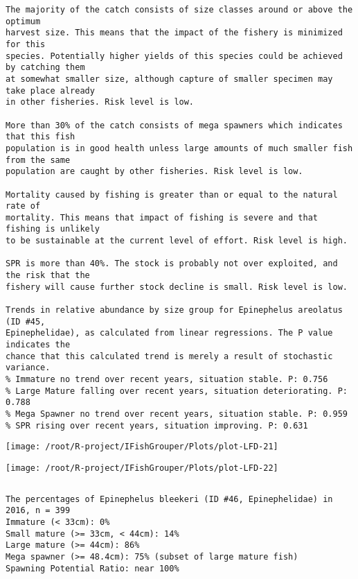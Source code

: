\documentclass{report}\usepackage[]{graphicx}\usepackage[]{color}
\makeatletter
\def\maxwidth{ %
  \ifdim\Gin@nat@width>\linewidth
    \linewidth
  \else
    \Gin@nat@width
  \fi
}
\newenvironment{kframe}{%
 \def\at@end@of@kframe{}%
 \ifinner\ifhmode%
  \def\at@end@of@kframe{\end{minipage}}%
  \begin{minipage}{\columnwidth}%
 \fi\fi%
 \def\FrameCommand##1{\hskip\@totalleftmargin \hskip-\fboxsep
 \colorbox{shadecolor}{##1}\hskip-\fboxsep
     \hskip-\linewidth \hskip-\@totalleftmargin \hskip\columnwidth}%
 \MakeFramed {\advance\hsize-\width
   \@totalleftmargin\z@ \linewidth\hsize
   \@setminipage}}%
 {\par\unskip\endMakeFramed%
 \at@end@of@kframe}
\newenvironment{knitrout}{}{} %
\makeatother
\begin{document}
\begin{knitrout}
\begin{kframe}
\begin{verbatim}
The majority of the catch consists of size classes around or above the optimum
harvest size. This means that the impact of the fishery is minimized for this
species. Potentially higher yields of this species could be achieved by catching them
at somewhat smaller size, although capture of smaller specimen may take place already
in other fisheries. Risk level is low.

More than 30% of the catch consists of mega spawners which indicates that this fish
population is in good health unless large amounts of much smaller fish from the same
population are caught by other fisheries. Risk level is low.
 
Mortality caused by fishing is greater than or equal to the natural rate of
mortality. This means that impact of fishing is severe and that fishing is unlikely
to be sustainable at the current level of effort. Risk level is high.
 
SPR is more than 40%. The stock is probably not over exploited, and the risk that the
fishery will cause further stock decline is small. Risk level is low.
 
Trends in relative abundance by size group for Epinephelus areolatus (ID #45,
Epinephelidae), as calculated from linear regressions. The P value indicates the
chance that this calculated trend is merely a result of stochastic variance.
% Immature no trend over recent years, situation stable. P: 0.756
% Large Mature falling over recent years, situation deteriorating. P: 0.788
% Mega Spawner no trend over recent years, situation stable. P: 0.959
% SPR rising over recent years, situation improving. P: 0.631
\end{verbatim}
\end{kframe}
\texttt{[image: /root/R-project/IFishGrouper/Plots/plot-LFD-21]} 

\texttt{[image: /root/R-project/IFishGrouper/Plots/plot-LFD-22]} 
\begin{kframe}\begin{verbatim}
\end{verbatim}
\end{kframe}
\clearpage
\newpage
\begin{kframe}\begin{verbatim}The percentages of Epinephelus bleekeri (ID #46, Epinephelidae) in 2016, n = 399
Immature (< 33cm): 0%
Small mature (>= 33cm, < 44cm): 14%
Large mature (>= 44cm): 86%
Mega spawner (>= 48.4cm): 75% (subset of large mature fish)
Spawning Potential Ratio: near 100%
 

\end{verbatim}
\end{kframe}
\end{knitrout}
\end{document}
